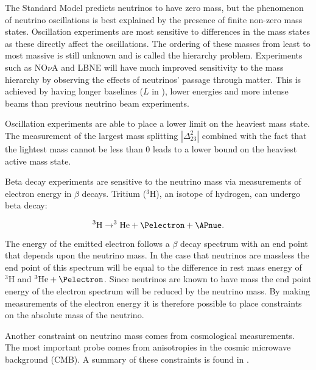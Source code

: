 The Standard Model predicts neutrinos to have zero mass, but the phenomenon of neutrino oscillations is best explained by the presence of finite non-zero mass states. Oscillation experiments are most sensitive to differences in the mass states as these directly affect the oscillations. The ordering of these masses from least to most massive is still unknown and is called the hierarchy problem. Experiments such as NO$\nu$A \cite{Ayres:2004js} and LBNE \cite{Adams:2013qkq} will have much improved sensitivity to the mass hierarchy by observing the effects of neutrinos' passage through matter. This is achieved by having longer baselines ($L$ in ), lower energies and more intense beams than previous neutrino beam experiments.

Oscillation experiments are able to place a lower limit on the heaviest mass state. The measurement of the largest mass splitting $|\Delta_{23}^{2}|$ combined with the fact that the lightest mass cannot be less than 0 leads to a lower bound on the heaviest active mass state.


Beta decay experiments are sensitive to the neutrino mass via measurements of electron energy in $\beta$ decays. Tritium ($^3\mbox{H}$), an isotope of hydrogen, can undergo beta decay:

\begin{equation}
  ^{3}\mbox{H} \rightarrow ^{3}\mbox{He} + \Pelectron + \APnue.
  \label{eq:particle-physics:neutrino-mass:tritium-decay}
\end{equation}

\noindent The energy of the emitted electron follows a $\beta$ decay spectrum with an end point that depends upon the neutrino mass. In the case that neutrinos are massless the end point of this spectrum will be equal to the difference in rest mass energy of $^{3}\mbox{H}$ and $^{3}\mbox{He} + \Pelectron$. Since neutrinos are known to have mass the end point energy of the electron spectrum will be reduced by the neutrino mass. By making measurements of the electron energy it is therefore possible to place constraints on the absolute mass of the neutrino.

Another constraint on neutrino mass comes from cosmological measurements. The most important probe comes from anisotropies in the cosmic microwave background (CMB). A summary of these constraints is found in .

